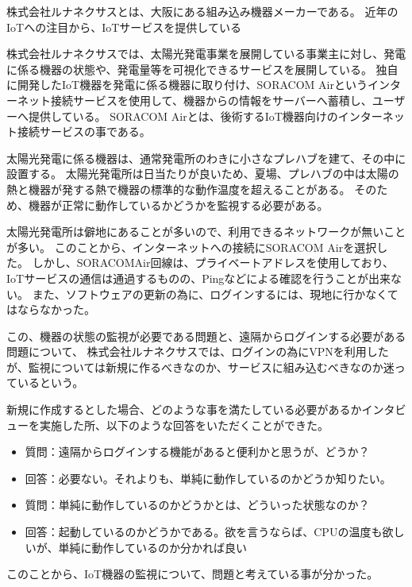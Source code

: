 
\begin{comment}
また、IoTサービスを開発しているルナネクサスさんへ聞き取りを行った。
・ルナネクサスさんの説明
・ルナネクサスさんが開発しているサービスの説明
・どのような点で困っているのか、等の聞き取り結果
\end{comment}

株式会社ルナネクサスとは、大阪にある組み込み機器メーカーである。
近年のIoTへの注目から、IoTサービスを提供している

株式会社ルナネクサスでは、太陽光発電事業を展開している事業主に対し、発電に係る機器の状態や、発電量等を可視化できるサービスを展開している。
独自に開発したIoT機器を発電に係る機器に取り付け、SORACOM Airというインターネット接続サービスを使用して、機器からの情報をサーバーへ蓄積し、ユーザーへ提供している。
SORACOM Airとは、後術するIoT機器向けのインターネット接続サービスの事である。

太陽光発電に係る機器は、通常発電所のわきに小さなプレハブを建て、その中に設置する。
太陽光発電所は日当たりが良いため、夏場、プレハブの中は太陽の熱と機器が発する熱で機器の標準的な動作温度を超えることがある。
そのため、機器が正常に動作しているかどうかを監視する必要がある。

太陽光発電所は僻地にあることが多いので、利用できるネットワークが無いことが多い。
このことから、インターネットへの接続にSORACOM Airを選択した。
しかし、SORACOMAir回線は、プライベートアドレスを使用しており、IoTサービスの通信は通過するものの、Pingなどによる確認を行うことが出来ない。
また、ソフトウェアの更新の為に、ログインするには、現地に行かなくてはならなかった。

この、機器の状態の監視が必要である問題と、遠隔からログインする必要がある問題について、
株式会社ルナネクサスでは、ログインの為にVPNを利用したが、監視については新規に作るべきなのか、サービスに組み込むべきなのか迷っているという。

新規に作成するとした場合、どのような事を満たしている必要があるかインタビューを実施した所、以下のような回答をいただくことができた。
\begin{itemize}
\item 質問：遠隔からログインする機能があると便利かと思うが、どうか？
\item 回答：必要ない。それよりも、単純に動作しているのかどうか知りたい。
\item 質問：単純に動作しているのかどうかとは、どういった状態なのか？
\item 回答：起動しているのかどうかである。欲を言うならば、CPUの温度も欲しいが、単純に動作しているのか分かれば良い
\end{itemize}

このことから、IoT機器の監視について、問題と考えている事が分かった。

\begin{comment}
開発者の役に立つとは、どういうことなのか、

色々と制約があるが、簡単な監視ならできるのではないか、と思い試してみました。
本当はもう何回もやってみて、よりよいものにスべきところなのですが、
\end{comment}

